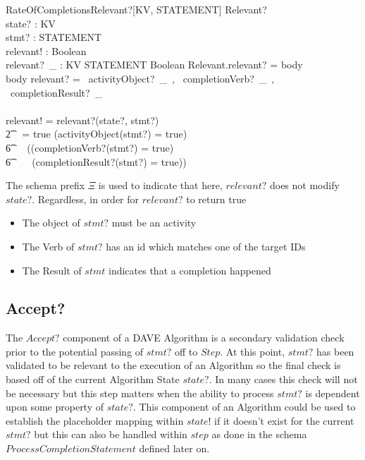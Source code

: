 \documentclass[../main.tex]{subfiles}
\begin{document}
\begin{schema}{\Xi RateOfCompletionsRelevant?[KV, STATEMENT]}
  Relevant? \\
  state? : KV \\
  stmt? : STATEMENT \\
  relevant! : Boolean \\
  relevant?~\_ : KV \cross STATEMENT \fun Boolean
  \where
  Relevant.relevant? = \langle body \rangle \\
  \langle body \rangle \bindsto relevant? = \langle ~activityObject?~\_~, \langle ~completionVerb?~\_~, ~completionResult?~\_ \rangle  \rangle \\ ~ \\
  relevant! = relevant?(state?, stmt?) \\
  \t2 ~ = true \iff (activityObject(stmt?) = true) ~\land \\
  \t6 \ ~ ((completionVerb?(stmt?) = true) ~\lor \\
  \t6 \ \ ~ (completionResult?(stmt?) = true))
\end{schema}
The schema prefix $\Xi$ is used to indicate that here, $relevant?$ does not modify $state?$.
Regardless, in order for $relevant?$ to return true
\begin{itemize}
\item The object of $stmt?$ must be an activity
\item The Verb of $stmt?$ has an id which matches one of the target IDs
\item The Result of $stmt$ indicates that a completion happened
\end{itemize}

\subsection{Accept?}
The $Accept?$ component of a DAVE Algorithm is a secondary validation check prior to the potential
passing of $stmt?$ off to $Step$. At this point, $stmt?$ has been validated to be relevant to the
execution of an Algorithm so the final check is based off of the current Algorithm State $state?$.
In many cases this check will not be necessary but this step matters when the ability to process $stmt?$
is dependent upon some property of $state?$. This component of an Algorithm could be used to establish
the placeholder mapping within $state!$ if it doesn't exist for the current $stmt?$ but this can also
be handled within $step$ as done in the schema $ProcessCompletionStatement$ defined later on.
\end{document}
